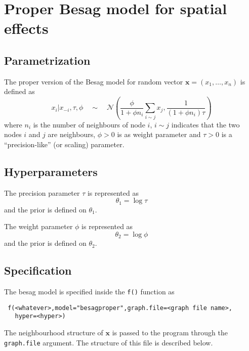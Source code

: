 \documentclass[a4paper,11pt]{article}
\begin{document}
\section*{Proper Besag model for spatial effects}

\subsection*{Parametrization}

The proper version of the Besag model for random vector
$\mathbf{x}=(x_1,\dots,x_n)$ is defined as
\begin{equation}\label{eq.besag}
    x_i|x_{-i},\tau,\phi\quad\sim\quad \mathcal{N}\left(\frac{\phi}{1+\phi
          n_i}\sum_{i\sim j}x_j,\frac{1}{(1 + \phi n_i)\tau}\right)
\end{equation}
where $n_i$ is the number of neighbours of node $i$, $i\sim j$
indicates that the two nodes $i$ and $j$ are neighbours, $\phi > 0$ is
as weight parameter and $\tau > 0$ is a ``precision-like'' (or
scaling) parameter.


\subsection*{Hyperparameters}

The precision parameter $\tau$ is represented as
\begin{displaymath}
    \theta_{1} =\log \tau
\end{displaymath}
and the prior is defined on $\theta_{1}$. 

The weight parameter $\phi$ is represented as
\begin{displaymath}
    \theta_{2} =\log \phi
\end{displaymath}
and the prior is defined on $\theta_{2}$. 

\subsection*{Specification}

The besag model is specified inside the {\tt f()} function as
\begin{verbatim}
 f(<whatever>,model="besagproper",graph.file=<graph file name>,
   hyper=<hyper>)
\end{verbatim}

The neighbourhood structure of $\mathbf{x}$ is passed to the program
through the {\tt graph.file} argument.  The structure of this file is
described below.
\end{document}

